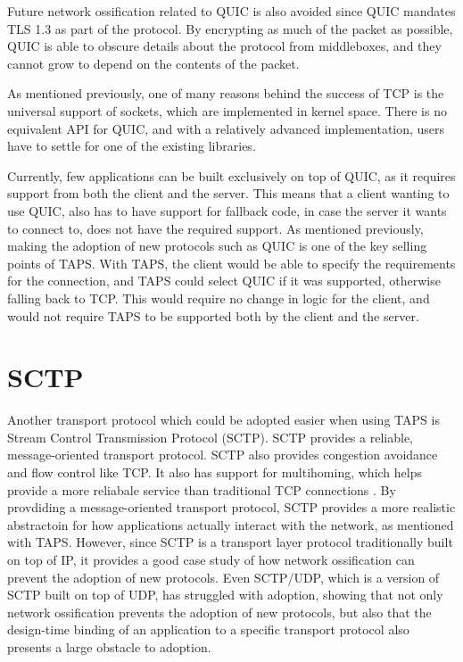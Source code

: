 Future network ossification related to QUIC is also avoided
since QUIC mandates TLS 1.3 as part of the protocol.
By encrypting as much of the packet as possible, QUIC is able to
obscure details about the protocol from middleboxes, and
they cannot grow to depend on the contents of the packet.

As mentioned previously, one of many reasons behind the success
of TCP is
the universal support of sockets, which are implemented in kernel space.
There is no equivalent API for QUIC, and with a relatively
advanced implementation, users have to settle for one of the
existing libraries.


Currently, few applications can be built exclusively on top of
QUIC, as it requires support from both the client and the
server. This means that a client wanting to use QUIC, also
has to have support for fallback code, in case the server
it wants to connect to, does not have the required support.
As mentioned previously, making the adoption of new protocols
such as QUIC is one of the key selling points of TAPS. With TAPS,
the client would be able to specify the requirements for the
connection, and TAPS could select QUIC if it was supported, otherwise
falling back to TCP. This would require no change in logic for
the client, and would not require TAPS to be supported both
by the client and the server.

\section{SCTP}
Another transport protocol which could be adopted easier
when using TAPS is Stream Control Transmission Protocol (SCTP).
SCTP provides a reliable, message-oriented transport protocol.
SCTP also provides congestion avoidance and flow control like TCP.
It also has support for multihoming, which helps provide a more
reliabale service than traditional TCP connections \cite{leungMultihomedCommunicationSCTP2013}.
By provdiding a message-oriented transport protocol, SCTP provides
a more realistic abstractoin for how applications actually interact
with the network, as mentioned with TAPS. 
However, since SCTP is a transport layer protocol traditionally
built on top of IP, it provides a good case study of how network
ossification can prevent the adoption of new protocols. Even
SCTP/UDP, which is a version of SCTP built on top of UDP, has
struggled with adoption, showing that not only network ossification
prevents the adoption of new protocols, but also that
the design-time binding of an application to a specific
transport protocol also presents a large obstacle to adoption.


